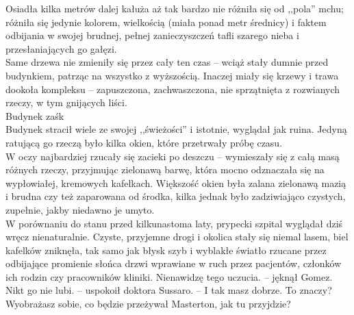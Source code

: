 \documentclass[../MAIN.tex]{subfiles}
\begin{document}
Osiadła kilka metrów dalej kałuża aż tak bardzo nie różniła się od ,,pola'' mchu; różniła się jedynie kolorem, wielkością (miała ponad metr średnicy) i faktem odbijania w swojej brudnej, pełnej zanieczyszczeń tafli szarego nieba i przesłaniających go gałęzi.\\
Same drzewa nie zmieniły się przez cały ten czas -- wciąż stały dumnie przed budynkiem, patrząc na wszystko z wyższością. Inaczej miały się krzewy i trawa dookoła kompleksu -- zapuszczona, zachwaszczona, nie sprzątnięta z rozwianych rzeczy, w tym gnijących liści.\\
Budynek zaś\3k\\
Budynek stracił wiele ze swojej ,,świeżości'' i istotnie, wyglądał jak ruina. Jedyną ratującą go rzeczą było kilka okien, które przetrwały próbę czasu.\\
W oczy najbardziej rzucały się zacieki po deszczu -- wymieszały się z całą masą różnych rzeczy, przyjmując zielonawą barwę, która mocno odznaczała się na wypłowiałej, kremowych kafelkach.
Większość okien była zalana zielonawą mazią i brudna czy też zaparowana od środka, kilka jednak było zadziwiająco czystych, zupełnie, jakby niedawno je umyto.\\
W porównaniu do stanu przed kilkunastoma laty, prypecki szpital wyglądał dziś wręcz nienaturalnie.
Czyste, przyjemne drogi i okolica stały się niemal lasem, biel kafelków zniknęła, tak samo jak błysk szyb i wyblakłe światło rzucane przez odbijające promienie słońca drzwi wprawiane w ruch przez pacjentów, członków ich rodzin czy pracowników kliniki.
\sx Nienawidzę tego uczucia. -- jęknął Gomez.
\xx Nikt go nie lubi. -- uspokoił doktora Sussaro. -- I tak masz dobrze.
\xx To znaczy?
\xx Wyobrażasz sobie, co będzie przeżywał Masterton, jak tu przyjdzie?
\qd
\end{document}
